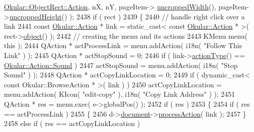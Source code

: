 \begin{DoxyCode}
      \hyperlink{classOkular_1_1ObjectRect_a2f77f7653306bae90bfb68277aaafe16a2ad02138861dfdc8bc2a0c29bae5bed2}{Okular::ObjectRect::Action}, nX, nY, pageItem->
      \hyperlink{classPageViewItem_a240924407ae22bb0489363a6a2d481b9}{uncroppedWidth}(), pageItem->\hyperlink{classPageViewItem_af1380fce5dc13a72458ef834c720b128}{uncroppedHeight}() );
2438                     \textcolor{keywordflow}{if} ( rect )
2439                     \{
2440                         \textcolor{comment}{// handle right click over a link}
2441                         \textcolor{keyword}{const} \hyperlink{classOkular_1_1Action}{Okular::Action} * link = \textcolor{keyword}{static\_cast<} \textcolor{keyword}{const }
      \hyperlink{classOkular_1_1Action}{Okular::Action} * \textcolor{keyword}{>}( rect->\hyperlink{classOkular_1_1ObjectRect_abb2a3c95452ae753a33f3f5c73391374}{object}() );
2442                         \textcolor{comment}{// creating the menu and its actions}
2443                         KMenu menu( \textcolor{keyword}{this} );
2444                         QAction * actProcessLink = menu.addAction( i18n( \textcolor{stringliteral}{"Follow This Link"} ) );
2445                         QAction * actStopSound = 0;
2446                         \textcolor{keywordflow}{if} ( link->\hyperlink{classOkular_1_1Action_ac4c2ef09b350b4041f8d1cfb261c3234}{actionType}() == 
      \hyperlink{classOkular_1_1Action_abe474735af30ea76105595533df9ec47ae1bf0d24610ef55451f2a122bbf48a3c}{Okular::Action::Sound} )
2447                             actStopSound = menu.addAction( i18n( \textcolor{stringliteral}{"Stop Sound"} ) );
2448                         QAction * actCopyLinkLocation = 0;
2449                         \textcolor{keywordflow}{if} ( dynamic\_cast< const Okular::BrowseAction * >( link ) )
2450                             actCopyLinkLocation = menu.addAction( KIcon( \textcolor{stringliteral}{"edit-copy"} ), i18n( \textcolor{stringliteral}{"Copy Link
       Address"} ) );
2451                         QAction * res = menu.exec( e->globalPos() );
2452                         \textcolor{keywordflow}{if} ( res )
2453                         \{
2454                             \textcolor{keywordflow}{if} ( res == actProcessLink )
2455                             \{
2456                                 d->\hyperlink{classPageViewPrivate_a50645b9853306cffd74e51efb677e5b4}{document}->\hyperlink{classOkular_1_1Document_aabdf41f40fe0391590391e303891b5ed}{processAction}( link );
2457                             \}
2458                             \textcolor{keywordflow}{else} \textcolor{keywordflow}{if} ( res == actCopyLinkLocation )

\end{DoxyCode}
